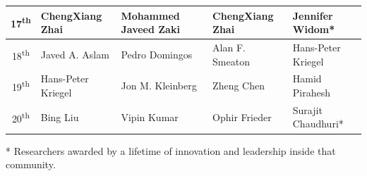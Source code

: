 \begin{table}[!htb]
{\begin{tabular}{|c|l|l|l|l|}
17\textsuperscript{th} & ChengXiang Zhai & Mohammed Javeed Zaki & ChengXiang Zhai & Jennifer Widom*\\ \hline
18\textsuperscript{th} & Javed A. Aslam & Pedro Domingos & Alan F. Smeaton & Hans-Peter Kriegel\\ \hline
19\textsuperscript{th} & Hans-Peter Kriegel & Jon M. Kleinberg & Zheng Chen & Hamid Pirahesh\\ \hline
20\textsuperscript{th} & Bing Liu & Vipin Kumar & Ophir Frieder & Surajit Chaudhuri*\\ \hline
\end{tabular}
}
\par\medskip\footnotesize{* Researchers awarded by a lifetime of innovation and leadership inside that community.}
\end{table}

